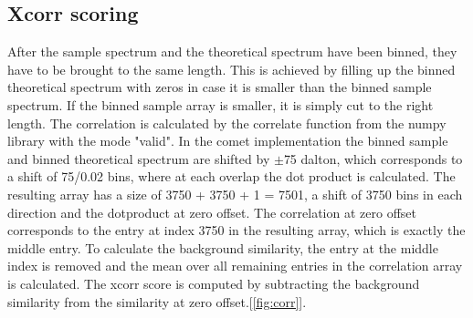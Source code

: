 \documentclass[11pt]{article}
\begin{document}
\subsection{Xcorr scoring}
After the sample spectrum and the theoretical spectrum have been binned, they have to be brought to the same length. This is achieved by filling up the binned theoretical spectrum with zeros in case it is smaller than the binned sample spectrum. If the binned sample array is smaller, it is simply cut to the right length. 
The correlation is calculated by the correlate function from the numpy library with the mode "valid". In the comet implementation the binned sample and binned theoretical spectrum are shifted by $\pm$75 dalton, which corresponds to a shift of 75/0.02 bins, where at each overlap the dot product is calculated. The resulting array has a size of 3750 + 3750 + 1 = 7501, a shift of 3750 bins in each direction and the dotproduct at zero offset. The correlation at zero offset corresponds to the entry at index 3750 in the resulting array, which is exactly the middle entry. To calculate the background similarity, the entry at the middle index is removed and the mean over all remaining entries in the correlation array is calculated. The xcorr score is computed by subtracting the background similarity from the similarity at zero offset.[\cref{fig:corr}].
\end{document}
